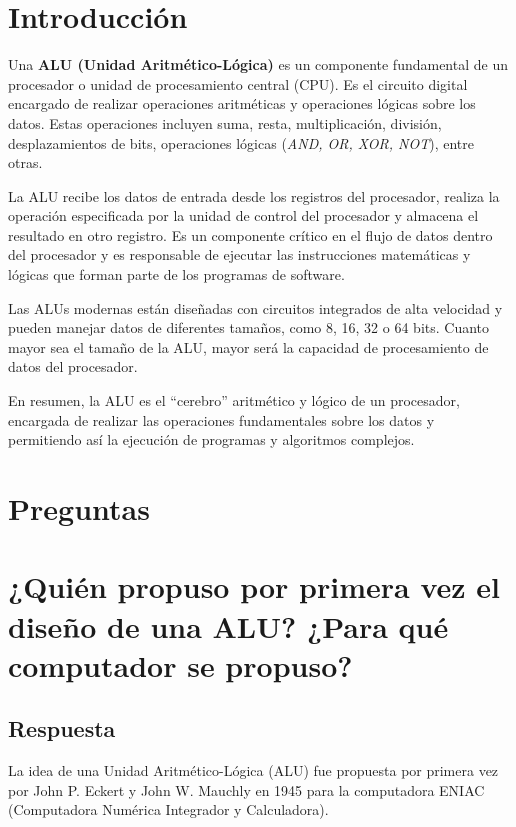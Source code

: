 \documentclass{article}
\begin{document}


\section {Introducción}

Una \textbf{ALU (Unidad Aritmético-Lógica)} es un componente fundamental de un procesador o unidad de procesamiento central (CPU). Es el circuito digital encargado de realizar operaciones aritméticas y operaciones lógicas sobre los datos. Estas operaciones incluyen suma, resta, multiplicación, división, desplazamientos de bits, operaciones lógicas (\textit{AND, OR, XOR, NOT}), entre otras.

La ALU recibe los datos de entrada desde los registros del procesador, realiza la operación especificada por la unidad de control del procesador y almacena el resultado en otro registro. Es un componente crítico en el flujo de datos dentro del procesador y es responsable de ejecutar las instrucciones matemáticas y lógicas que forman parte de los programas de software.

Las ALUs modernas están diseñadas con circuitos integrados de alta velocidad y pueden manejar datos de diferentes tamaños, como 8, 16, 32 o 64 bits. Cuanto mayor sea el tamaño de la ALU, mayor será la capacidad de procesamiento de datos del procesador.

En resumen, la ALU es el ``cerebro'' aritmético y lógico de un procesador, encargada de realizar las operaciones fundamentales sobre los datos y permitiendo así la ejecución de programas y algoritmos complejos.




\section*{Preguntas}

    \section{¿Quién propuso por primera vez el diseño de una ALU? ¿Para qué computador se propuso?}
    \subsection*{Respuesta}
    \item La idea de una Unidad Aritmético-Lógica (ALU) fue propuesta por primera vez por John P. Eckert y John W. Mauchly en 1945 para la computadora ENIAC (Computadora Numérica Integrador y Calculadora).
\end{document}
